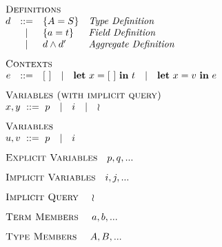 \begin{minipage}[t]{.4\textwidth}\[\begin{array}{r c l l}
    \multicolumn{4}{l}{\textsc{Definitions}}                  \\
    d & ::= & \DEF{A}{S}      & \textit{Type Definition     } \\
      &  |  & \DEF{a}{t}      & \textit{Field Definition    } \\
      &  |  & \AGG{d}{d'}     & \textit{Aggregate Definition} \\[3mm]
    \multicolumn{4}{l}{\textsc{Contexts}} \\
    e & ::= & \multicolumn{2}{l}{\HOL
        \quad | \quad \LET{x}{\HOL}{t}
        \quad | \quad \LET{x}{v}{e}} \\[3mm]
    \multicolumn{4}{l}{\textsc{Variables (with implicit query)}} \\
    \multicolumn{4}{l}{x, y\ ::=\ p \quad | \quad i \quad | \quad \IMP} \\[3mm]
    \multicolumn{4}{l}{\textsc{Variables}} \\
    \multicolumn{4}{l}{u, v\ ::=\  p \quad | \quad i} \\[3mm]
    \multicolumn{4}{l}{\textsc{Explicit Variables} \quad p, q, ...} \\[3mm]
    \multicolumn{4}{l}{\textsc{Implicit Variables} \quad i, j, ...} \\[3mm]
    \multicolumn{4}{l}{\textsc{Implicit Query    } \quad \IMP     } \\[3mm]
    \multicolumn{4}{l}{\textsc{Term Members      } \quad a, b, ...} \\[3mm]
    \multicolumn{4}{l}{\textsc{Type Members      } \quad A, B, ...} \\[3mm]
\end{array}\]\end{minipage}

